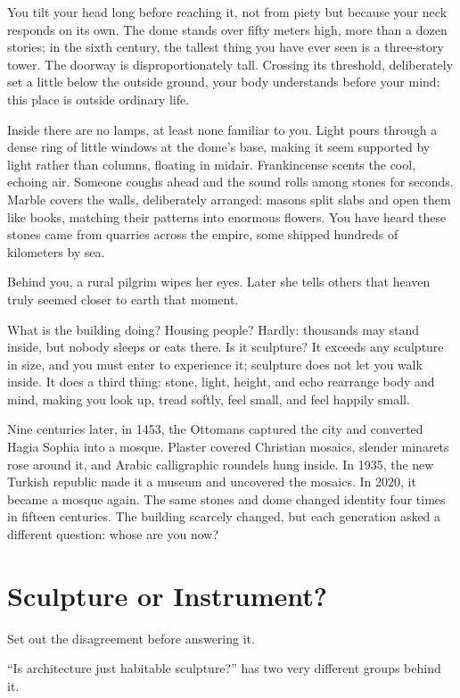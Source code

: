 You tilt your head long before reaching it, not from piety but because your neck responds on its own. The dome stands over fifty meters high, more than a dozen stories; in the sixth century, the tallest thing you have ever seen is a three-story tower. The doorway is disproportionately tall. Crossing its threshold, deliberately set a little below the outside ground, your body understands before your mind: this place is outside ordinary life.

Inside there are no lamps, at least none familiar to you. Light pours through a dense ring of little windows at the dome's base, making it seem supported by light rather than columns, floating in midair. Frankincense scents the cool, echoing air. Someone coughs ahead and the sound rolls among stones for seconds. Marble covers the walls, deliberately arranged: masons split slabs and open them like books, matching their patterns into enormous flowers. You have heard these stones came from quarries across the empire, some shipped hundreds of kilometers by sea.

Behind you, a rural pilgrim wipes her eyes. Later she tells others that heaven truly seemed closer to earth that moment.

What is the building doing? Housing people? Hardly: thousands may stand inside, but nobody sleeps or eats there. Is it sculpture? It exceeds any sculpture in size, and you must enter to experience it; sculpture does not let you walk inside. It does a third thing: stone, light, height, and echo rearrange body and mind, making you look up, tread softly, feel small, and feel happily small.

Nine centuries later, in 1453, the Ottomans captured the city and converted Hagia Sophia into a mosque. Plaster covered Christian mosaics, slender minarets rose around it, and Arabic calligraphic roundels hung inside. In 1935, the new Turkish republic made it a museum and uncovered the mosaics. In 2020, it became a mosque again. The same stones and dome changed identity four times in fifteen centuries. The building scarcely changed, but each generation asked a different question: whose are you now?

\section{Sculpture or Instrument?}
Set out the disagreement before answering it.

``Is architecture just habitable sculpture?'' has two very different groups behind it.

